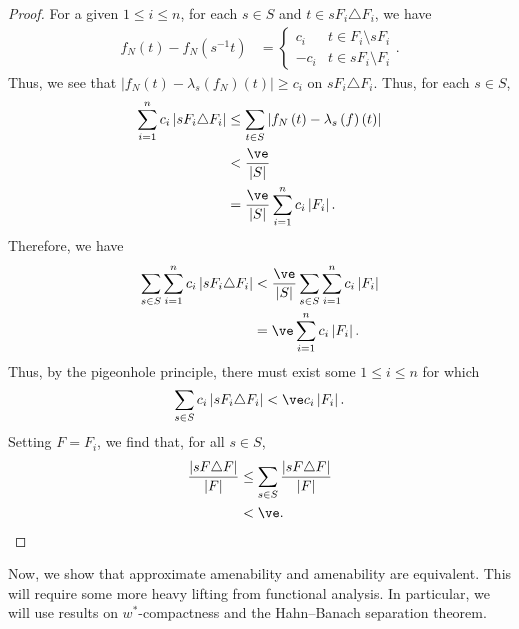 \begin{proof}
  For a given $1 \leq i \leq n$, for each $s\in S$ and $t\in sF_i\triangle F_i$, we have
  \begin{align*}
    f_N\left(t\right) - f_N\left(s^{-1}t\right) &= \begin{cases}
      c_i & t\in F_i\setminus sF_i\\
      -c_i & t\in sF_i \setminus F_i
    \end{cases}.
  \end{align*}
  Thus, we see that $\left\vert f_N\left(t\right)-\lambda_s\left(f_N\right)\left(t\right) \right\vert\geq c_i$ on $sF_i\triangle F_i$. Thus, for each $s\in S$,
  \begin{align*}
    \sum_{i=1}^{n}c_i\left\vert sF_i \triangle F_i \right\vert &\leq \sum_{t\in S}\left\vert f_N\left(t\right) -  \lambda_s\left(f\right)\left(t\right)\right\vert\\
                                                               &< \frac{\ve}{\left\vert S \right\vert}\\
                                                               &= \frac{\ve}{\left\vert S \right\vert} \sum_{i=1}^{n}c_i\left\vert F_i \right\vert.
  \end{align*}
  Therefore, we have
  \begin{align*}
    \sum_{s\in S}\sum_{i=1}^{n}c_i\left\vert sF_i\triangle F_i \right\vert &< \frac{\ve}{\left\vert S \right\vert}\sum_{s\in S}\sum_{i=1}^{n}c_i\left\vert F_i \right\vert\\
                                                                           &= \ve \sum_{i=1}^{n}c_i\left\vert F_i \right\vert.
  \end{align*}
  Thus, by the pigeonhole principle, there must exist some $1\leq i \leq n$ for which
  \begin{align*}
    \sum_{s\in S}c_i\left\vert sF_i\triangle F_i \right\vert < \ve c_i\left\vert F_i \right\vert.
  \end{align*}
  Setting $F = F_i$, we find that, for all $s\in S$,
  \begin{align*}
    \frac{\left\vert sF\triangle F \right\vert}{\left\vert F \right\vert} &\leq \sum_{s\in S}\frac{\left\vert sF\triangle F \right\vert}{\left\vert F \right\vert}\\
                                                                          &< \ve.
  \end{align*}
\end{proof}
Now, we show that approximate amenability and amenability are equivalent. This will require some more heavy lifting from functional analysis. In particular, we will use results on $w^{\ast}$-compactness and the Hahn--Banach separation theorem.
